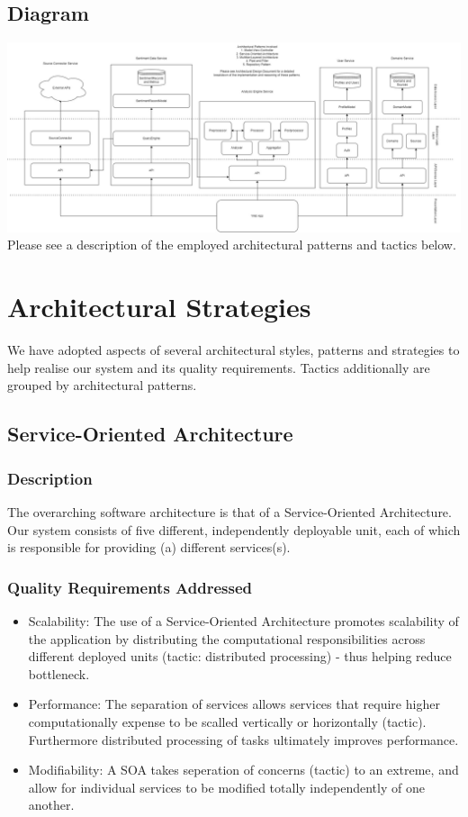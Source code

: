 \documentclass[12pt]{article}
\begin{document}
\subsection{Diagram}
\includegraphics[width=1\textwidth]{Demo2Architecture.jpg}
Please see a description of the employed architectural patterns and tactics below.



\section{Architectural Strategies}
We have adopted aspects of several architectural styles, patterns and strategies to help realise our system and its quality requirements. Tactics additionally are grouped by architectural patterns.
\subsection{Service-Oriented Architecture}
\subsubsection{Description}
The overarching software architecture is that of a Service-Oriented Architecture. Our system consists of five different, independently deployable unit, each of which is responsible for providing (a) different services(s).
\subsubsection{Quality Requirements Addressed}
\begin{itemize}
    \item Scalability: The use of a Service-Oriented Architecture promotes scalability of the application by distributing the computational responsibilities across different deployed units (tactic: distributed processing) - thus helping reduce bottleneck.
    \item Performance: The separation of services allows services that require higher computationally expense to be scalled vertically or horizontally (tactic). Furthermore distributed processing of tasks ultimately improves performance.
    \item Modifiability: A SOA takes seperation of concerns (tactic) to an extreme, and allow for individual services to be modified totally independently of one another.
\end{itemize}
\end{document}

